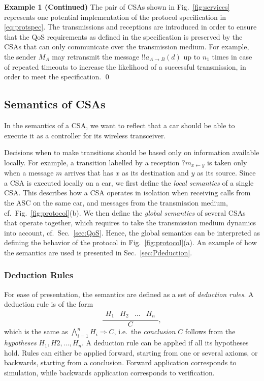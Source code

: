 \documentclass{sig-alternate}
\newenvironment{excont}[1]{\textbf{Example 1 (#1)}}{\qed}
\newcommand{\define}{\sl}
\newcommand{\fig}[1]{Fig.\ \ref{fig:#1}}
\renewcommand{\sec}[1]{Sec.\ \ref{sec:#1}}
\begin{document}
\begin{excont}{Continued}
The pair of CSAs shown in \fig{services} represents one potential implementation of the protocol specification in \eqref{eq:protspec}. The transmissions and receptions are introduced in order to ensure that the QoS requirements as defined in the specification is preserved by the CSAs that can only communicate over the transmission medium. For example, the sender $M_A$ may retransmit the message $!!a_{A \rightarrow B}(d)$ up to $n_1$ times in case of repeated timeouts to increase the likelihood of a successful transmission, in order to meet the specification.
\end{excont}



\subsection{Semantics of CSAs}

In the semantics of a CSA, we want to reflect that a car should be able to execute it as a controller for its wireless transceiver.

Decisions when to make transitions should be based only on information available locally. For example, a transition labelled by a reception $?m_{x \leftarrow y}$ is taken only when a message $m$ arrives that has $x$ as its destination and $y$ as its source. Since a CSA is executed locally on a car, we first define the {\define local semantics} of a single CSA. This describes how a CSA operates in isolation when receiving calls from the ASC on the same car, and messages from the transmission medium, cf.\ \fig{protocol}(b). We then define the {\define global semantics} of several CSAs that operate together, which requires to take the transmission medium dynamics into account, cf.\ \sec{QoS}. Hence, the global semantics can be interpreted as defining the behavior of the protocol in \fig{protocol}(a). An example of how the semantics are used is presented in \sec{Pdeduction}.

\subsubsection{Deduction Rules}

For ease of presentation, the semantics are defined as a set of {\define deduction rules}. A deduction rule is of the form
\begin{equation*}
\frac{
\begin{array}{cccc}
	H_1 & H_2 & \ldots & H_n
\end{array}}{
C},
\end{equation*}
which is the same as $\bigwedge_{i = 1}^n{H_i} \Rightarrow C$, i.e.\ the {\define conclusion} $C$ follows from the {\define hypotheses} $H_1, H2, \ldots, H_n$. A deduction rule can be applied if all its hypotheses hold. Rules can either be applied forward, starting from one or several axioms, or backwards, starting from a conclusion. Forward application corresponds to simulation, while backwards application corresponds to verification.
\end{document}
